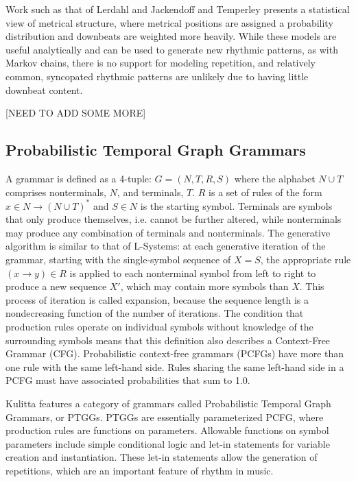 \documentclass{article}
\begin{document}
Work such as that of Lerdahl and Jackendoff \cite{gttm} and Temperley \cite{temperley2010} presents a statistical view of metrical structure, where metrical positions are assigned a probability distribution and downbeats are weighted more heavily. While these models are useful analytically and can be used to generate new rhythmic patterns, as with Markov chains, there is no support for modeling repetition, and relatively common, syncopated rhythmic patterns are unlikely due to having little downbeat content. 

[NEED TO ADD SOME MORE]

\subsection{Probabilistic Temporal Graph Grammars}

A grammar is defined as a 4-tuple: $G = (N,T,R,S)$ where the alphabet $N \cup T$ comprises nonterminals, $N$, and terminals, $T$. $R$ is a set of rules of the form $x \in N \rightarrow (N \cup T)^{*}$ and $S \in N$ is the starting symbol. Terminals are symbols that only produce themselves, i.e. cannot be further altered, while nonterminals may produce any combination of terminals and nonterminals. The generative algorithm is similar to that of L-Systems: at each generative iteration of the grammar, starting with the single-symbol sequence of $X = S$, the appropriate rule $(x \rightarrow y) \in R$ is applied to each nonterminal symbol from left to right to produce a new sequence $X'$, which may contain more symbols than $X$. This process of iteration is called expansion, because the sequence length is a nondecreasing function of the number of iterations. The condition that production rules operate on individual symbols without knowledge of the surrounding symbols means that this definition also describes a Context-Free Grammar (CFG). Probabilistic context-free grammars (PCFGs) have more than one rule with the same left-hand side. Rules sharing the same left-hand side in a PCFG must have associated probabilities that sum to 1.0.

Kulitta features a category of grammars called Probabilistic Temporal Graph Grammars\cite{quick2013farm, quick_thesis}, or PTGGs. PTGGs are essentially parameterized PCFG, where production rules are functions on parameters. Allowable functions on symbol parameters include simple conditional logic and let-in statements for variable creation and instantiation. These let-in statements allow the generation of repetitions, which are an important feature of rhythm in music.
\end{document}
